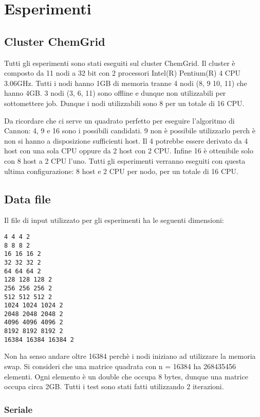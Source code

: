 \chapter{Esperimenti}

\section{Cluster ChemGrid}

Tutti gli esperimenti sono stati eseguiti sul cluster ChemGrid. Il cluster \`{e} composto da 11 nodi a 32 bit con 2 processori Intel(R) Pentium(R) 4 CPU 3.06GHz. Tutti i nodi hanno 1GB di memoria tranne 4 nodi (8, 9 10, 11) che hanno 4GB. 3 nodi (3, 6, 11) sono offline e dunque non utilizzabili per sottomettere job. Dunque i nodi utilizzabili sono 8 per un totale di 16 CPU.

Da ricordare che ci serve un quadrato perfetto per eseguire l'algoritmo di Cannon: 4, 9 e 16 sono i possibili candidati. 9 non \`{e} possibile utilizzarlo perch \`{e} non si hanno a disposizione sufficienti host.
Il 4 potrebbe essere derivato da 4 host con una sola CPU oppure da 2 host con 2 CPU. Infine 16 \`{e} ottenibile solo con 8 host a 2 CPU l'uno.
Tutti gli esperimenti verranno eseguiti con questa ultima configurazione: 8 host e 2 CPU per nodo, per un totale di 16 CPU.

\section{Data file}

Il file di input utilizzato per gli esperimenti ha le seguenti dimensioni:

\begin{lstlisting}
4 4 4 2
8 8 8 2
16 16 16 2
32 32 32 2
64 64 64 2
128 128 128 2
256 256 256 2
512 512 512 2
1024 1024 1024 2
2048 2048 2048 2
4096 4096 4096 2
8192 8192 8192 2
16384 16384 16384 2
\end{lstlisting}

Non ha senso andare oltre 16384 perch\`{e} i nodi iniziano ad utilizzare la memoria swap. Si consideri che una matrice quadrata con n = 16384 ha 268435456 elementi. Ogni elemento \`{e} un double che occupa 8 bytes, dunque una matrice occupa circa 2GB.
Tutti i test sono stati fatti utilizzando 2 iterazioni.

\subsection{Seriale}

